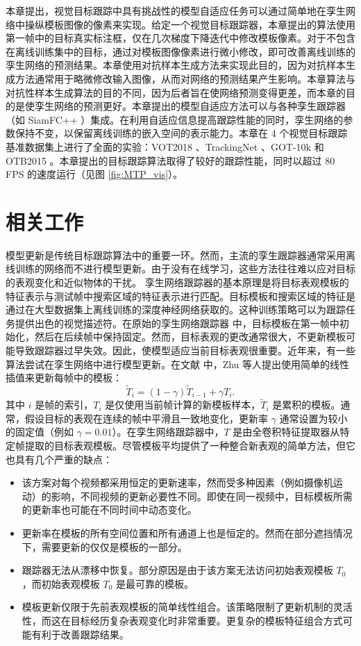 本章提出，视觉目标跟踪中具有挑战性的模型自适应任务可以通过简单地在孪生网络中操纵模板图像的像素来实现。给定一个视觉目标跟踪器，本章提出的算法使用第一帧中的目标真实标注框，仅在几次梯度下降迭代中修改模板像素。对于不包含在离线训练集中的目标，通过对模板图像像素进行微小修改，即可改善离线训练的孪生网络的预测结果。本章使用对抗样本生成方法来实现此目的，因为对抗样本生成方法通常用于略微修改输入图像，从而对网络的预测结果产生影响。本章算法与对抗性样本生成算法的目的不同，因为后者旨在使网络预测变得更差，而本章的目的是使孪生网络的预测更好。本章提出的模型自适应方法可以与各种孪生跟踪器（如 SiamFC++ \cite{SiamFC++}）集成。在利用自适应信息提高跟踪性能的同时，孪生网络的参数保持不变，以保留离线训练的嵌入空间的表示能力。本章在 4 个视觉目标跟踪基准数据集上进行了全面的实验：VOT2018 \cite{kristan2018sixth}、TrackingNet \cite{muller2018trackingnet}、GOT-10k \cite{GOT-10k} 和 OTB2015 \cite{OTB2015}。本章提出的目标跟踪算法取得了较好的跟踪性能，同时以超过 80 FPS 的速度运行（见图 \ref{fig:MTP_vis}）。
\section{相关工作}
模型更新是传统目标跟踪算法中的重要一环。然而，主流的孪生跟踪器通常采用离线训练的网络而不进行模型更新。由于没有在线学习，这些方法往往难以应对目标的表观变化和近似物体的干扰。
孪生网络跟踪器的基本原理是将目标表观模板的特征表示与测试帧中搜索区域的特征表示进行匹配。目标模板和搜索区域的特征是通过在大型数据集上离线训练的深度神经网络获取的。这种训练策略可以为跟踪任务提供出色的视觉描述符。在原始的孪生网络跟踪器 \cite{SiamFC} 中，目标模板在第一帧中初始化，然后在后续帧中保持固定。然而，目标表观的更改通常很大，不更新模板可能导致跟踪器过早失效。因此，使模型适应当前目标表观很重要。近年来，有一些算法尝试在孪生网络中进行模型更新。在文献 \cite{zhu2018distractor} 中，Zhu 等人提出使用简单的线性插值来更新每帧中的模板：
\begin{equation}
\widetilde{T}_{i}=(1-\gamma) \widetilde{T}_{i-1}+\gamma T_{i}.
\end{equation}
其中 $i$ 是帧的索引，$T_{i}$ 是仅使用当前帧计算的新模板样本，$\widetilde{T}_{i}$ 是累积的模板。通常，假设目标的表观在连续的帧中平滑且一致地变化，更新率 $\gamma$ 通常设置为较小的固定值（例如 $\gamma = 0.01$）。在孪生网络跟踪器中，$T$ 是由全卷积特征提取器从特定帧提取的目标表观模板。尽管模板平均提供了一种整合新表观的简单方法，但它也具有几个严重的缺点：

\begin{itemize}
\item 该方案对每个视频都采用恒定的更新速率，然而受多种因素（例如摄像机运动）的影响，不同视频的更新必要性不同。即使在同一视频中，目标模板所需的更新率也可能在不同时间中动态变化。
\item 更新率在模板的所有空间位置和所有通道上也是恒定的。然而在部分遮挡情况下，需要更新的仅仅是模板的一部分。
\item 跟踪器无法从漂移中恢复。部分原因是由于该方案无法访问初始表观模板 $T_{0}$，而初始表观模板 $T_{0}$ 是最可靠的模板。
\item 模板更新仅限于先前表观模板的简单线性组合。该策略限制了更新机制的灵活性，而这在目标经历复杂表观变化时非常重要。更复杂的模板特征组合方式可能有利于改善跟踪结果。
\end{itemize}

